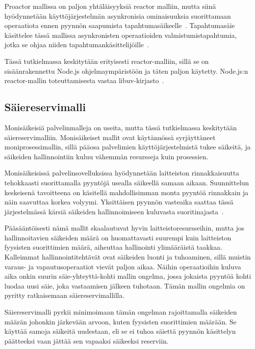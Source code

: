 \documentclass[12pt]{article}
\begin{document}
Proactor mallissa on paljon yhtäläisyyksiä reactor malliin, mutta siinä
hyödynnetään käyttöjärjestelmän asynkronisia ominaisuuksia suorittamaan
operaatiota ennen pyynnön saapumista tapahtumasäikeelle~\cite{pyarali_proactor_1997}.
Tapahtumasäie käsittelee tässä mallissa asynkronisten operaatioiden
valmistumistapahtumia, jotka se ohjaa
niiden tapahtumankäsittelijöille~\cite{pyryali_proactor_1997}.


 Tässä tutkielmassa keskitytään erityisesti
reactor-malliin, sillä se on sisäänrakennettu Node.js ohjelmaympäristöön ja
täten paljon käytetty. Node.js:n reactor-mallin toteuttamisesta vastaa
libuv-kirjasto~\cite{libuv_design_2019}.

\subsection{Säiereservimalli}
Monisäikeisiä palvelinmalleja on useita, mutta tässä tutkielmassa keskitytään säiereservimalliin.
Monisäikeiset mallit ovat käytännössä syrjäyttäneet moniprosessimallin, sillä pääosa
palvelimien käyttöjärjestelmistä tukee säikeitä, ja säikeiden hallinnointiin
kuluu vähemmän resursseja kuin prosessien.

Monisäikeisissä palvelinsovelluksissa hyödynnetään laitteiston
rinnakkaisuutta tehokkaasti suorittamalla pyyntöjä usealla säikeellä samaan
aikaan. Suunnittelun keskeisenä
tavoitteena on käsitellä mahdollisimman monta pyyntöä rinnakkain ja 
näin saavuttaa korkea volyymi. Yksittäisen pyynnön
vasteaika saattaa tässä
järjestelmässä kärsiä säikeiden hallinnoimiseen kuluvasta suoritinajasta~\cite{easton_developing_2004}.

Pääsääntöisesti nämä mallit skaalautuvat hyvin laitteistoresursseihin,
mutta jos hallinnoitavien säikeiden määrä on huomattavasti suurempi kuin laitteiston
fyysisten suorittimien määrä, aiheuttaa hallinointi ylimääräistä taakkaa.
Kalleimmat hallinnointitehtävät ovat säikeiden luonti ja tuhoaminen, sillä
muistin varaus- ja vapautusoperaatiot vievät paljon aikaa.
Näihin operaatioihin kuluva aika onkin suurin säie-yhteyttä-kohti mallin
ongelma, jossa jokaista pyyntöä kohti
luodaa uusi säie, joka vastaamisen jälkeen tuhotaan.
Tämän mallin ongelmia on pyritty ratkaisemaan säiereservimallilla.

Säiereservimalli pyrkii minimoimaan tämän ongelman rajoittamalla
säikeiden määrän johonkin järkevään arvoon, kuten fyysisten suorittimien
määrään. Se käyttää samoja säikeitä uudestaan, eli se ei tuhoa säiettä
pyynnön käsittelyn päätteeksi vaan jättää sen vapaaksi säikeeksi reserviin.
\end{document}
